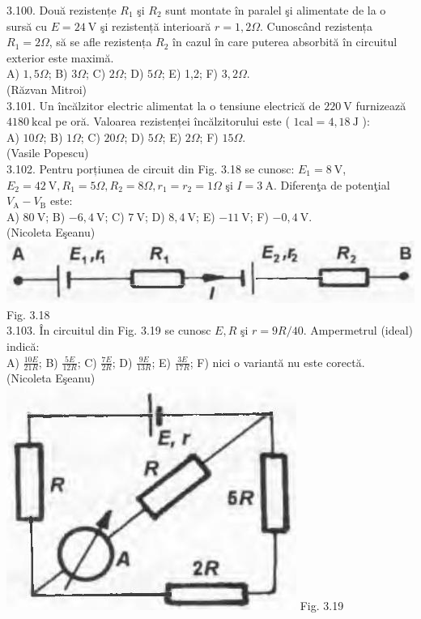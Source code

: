 3.100. Două rezistențe $R_{1}$ şi $R_{2}$ sunt montate în paralel şi alimentate de la o sursă cu $E=24 \mathrm{~V}$ şi rezistență interioară $r=1,2 \Omega$. Cunoscând rezistența $R_{1}=2 \Omega$, să se afle rezistența $R_{2}$ în cazul în care puterea absorbită în circuitul exterior este maximă.\\ A) $1,5 \Omega$; B) $3 \Omega$; C) $2 \Omega$; D) $5 \Omega$; E) 1,2; F) $3,2 \Omega$.\\ (Răzvan Mitroi)\\

3.101. Un încălzitor electric alimentat la o tensiune electrică de $220 \mathrm{~V}$ furnizează $4180 \mathrm{~kcal}$ pe oră. Valoarea rezistenței încălzitorului este ( $1 \mathrm{cal}=4,18 \mathrm{~J}$ ):\\ A) $10 \Omega$; B) $1 \Omega$; C) $20 \Omega$; D) $5 \Omega$; E) $2 \Omega$; F) $15 \Omega$.\\ (Vasile Popescu)\\

3.102. Pentru porțiunea de circuit din Fig. 3.18 se cunosc: $E_{1}=8 \mathrm{~V}$, $E_{2}=42 \mathrm{~V}, R_{1}=5 \Omega, R_{2}=8 \Omega, r_{1}=r_{2}=1 \Omega$ şi $I=3 \mathrm{~A}$. Diferenţa de potenţial $V_{\mathrm{A}}-V_{\mathrm{B}}$ este:\\ A) $80 \mathrm{~V}$; B) $-6,4 \mathrm{~V}$; C) $7 \mathrm{~V}$; D) $8,4 \mathrm{~V}$; E) $-11 \mathrm{~V}$; F) $-0,4 \mathrm{~V}$.\\ (Nicoleta Eşeanu)\\ \includegraphics[width=0.4\linewidth]{images/2025_07_01_5b3ff9fa0d508c8e9f17g-166} Fig. 3.18\\

3.103. În circuitul din Fig. 3.19 se cunosc $E, R$ şi $r=9 R / 40$. Ampermetrul (ideal) indică:\\ A) $\frac{10 E}{21 R}$; B) $\frac{5 E}{12 R}$; C) $\frac{7 E}{2 R}$; D) $\frac{9 E}{13 R}$; E) $\frac{3 E}{17 R}$; F) nici o variantă nu este corectă.\\ (Nicoleta Eşeanu)\\ \includegraphics[width=0.4\linewidth]{images/2025_07_01_5b3ff9fa0d508c8e9f17g-166(1)} Fig. 3.19\\

